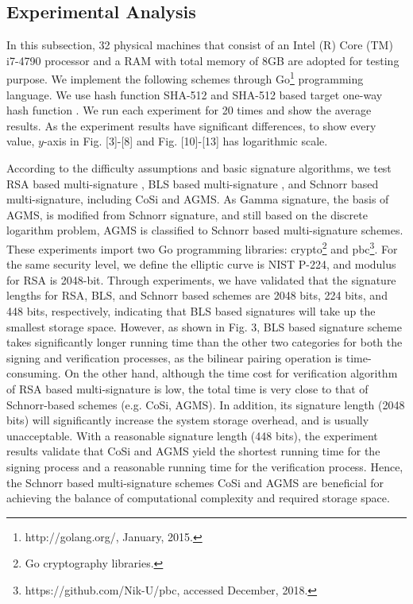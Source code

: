 \documentclass[journal]{IEEEtran}
\begin{document}
\subsection{Experimental Analysis}
In this subsection, 32 physical machines that consist of an Intel (R) Core (TM) i7-4790 processor and a RAM with total memory of 8GB are adopted for testing purpose. We implement the following schemes through Go\footnote[1]{http://golang.org/, January, 2015.} programming language. We use hash function SHA-512 \cite{U2012Secure} and SHA-512 based target one-way hash function \cite{01DBLP:journals/tifs/YaoZ13}. We run each experiment for 20 times and show the average results. As the experiment results have significant differences, to show every value, $y$-axis in Fig. [3]-[8] and Fig. [10]-[13] has logarithmic scale.

According to the difficulty assumptions and basic signature algorithms, we test RSA based multi-signature \cite{DBLP:conf/eurocrypt/HohenbergerW18}, BLS based multi-signature \cite{07DBLP:conf/asiacrypt/BonehDN18}, and Schnorr based multi-signature, including CoSi \cite{02DBLP:conf/sp/SytaTVWJGGKF16} and AGMS.
As Gamma signature, the basis of AGMS, is modified from Schnorr signature, and still based on the discrete logarithm problem, AGMS is classified to Schnorr based multi-signature schemes.
These experiments import two Go programming libraries: crypto\footnote[2]{Go cryptography libraries.} and pbc\footnote[3]{https://github.com/Nik-U/pbc, accessed December, 2018.}.
For the same security level, we define the elliptic curve is NIST P-224, and modulus for RSA is 2048-bit.
Through experiments, we have validated that the signature lengths for RSA, BLS, and Schnorr based schemes are 2048 bits, 224 bits, and 448 bits, respectively, indicating that BLS based signatures will take up the smallest storage space. However, as shown in Fig. 3, BLS based signature scheme takes significantly longer running time than the other two categories for both the signing and verification processes, as the bilinear pairing operation is time-consuming. On the other hand, although the time cost for verification algorithm of RSA based multi-signature is low, the total time is very close to that of Schnorr-based schemes (e.g. CoSi, AGMS). In addition, its signature length (2048 bits) will significantly increase the system storage overhead, and is usually unacceptable. With a reasonable signature length (448 bits), the experiment results validate that CoSi and AGMS yield the shortest running time for the signing process and a reasonable running time for the verification process.
Hence, the Schnorr based multi-signature schemes CoSi and AGMS are beneficial for achieving the balance of computational complexity and required storage space.
\end{document}
